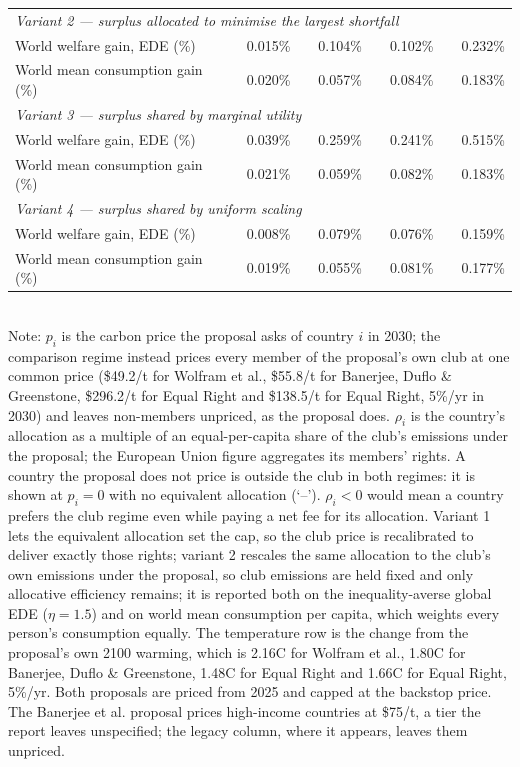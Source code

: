 \begin{table}[htbp]
\begin{tabular}{lcccccccc}
  \midrule
  \multicolumn{9}{l}{\textit{Variant 2 --- surplus allocated to minimise the largest shortfall}} \\
  \quad World welfare gain, EDE (\%) &  & 0.015\% &  & 0.104\% &  & 0.102\% &  & 0.232\% \\
  \quad World mean consumption gain (\%) &  & 0.020\% &  & 0.057\% &  & 0.084\% &  & 0.183\% \\
  \midrule
  \multicolumn{9}{l}{\textit{Variant 3 --- surplus shared by marginal utility}} \\
  \quad World welfare gain, EDE (\%) &  & 0.039\% &  & 0.259\% &  & 0.241\% &  & 0.515\% \\
  \quad World mean consumption gain (\%) &  & 0.021\% &  & 0.059\% &  & 0.082\% &  & 0.183\% \\
  \midrule
  \multicolumn{9}{l}{\textit{Variant 4 --- surplus shared by uniform scaling}} \\
  \quad World welfare gain, EDE (\%) &  & 0.008\% &  & 0.079\% &  & 0.076\% &  & 0.159\% \\
  \quad World mean consumption gain (\%) &  & 0.019\% &  & 0.055\% &  & 0.081\% &  & 0.177\% \\
  \bottomrule
\end{tabular}
\label{tab:equiv_rights_B}
\\[4pt]
{\footnotesize Note: $p_i$ is the carbon price the proposal asks of country $i$ in 2030; the comparison regime instead prices every member of the proposal's own club at one common price (\$49.2/t for Wolfram et al., \$55.8/t for Banerjee, Duflo \& Greenstone, \$296.2/t for Equal Right and \$138.5/t for Equal Right, 5\%/yr in 2030) and leaves non-members unpriced, as the proposal does. $\rho_i$ is the country's allocation as a multiple of an equal-per-capita share of the club's emissions under the proposal; the European Union figure aggregates its members' rights. A country the proposal does not price is outside the club in both regimes: it is shown at $p_i=0$ with no equivalent allocation (`--'). $\rho_i < 0$ would mean a country prefers the club regime even while paying a net fee for its allocation. Variant 1 lets the equivalent allocation set the cap, so the club price is recalibrated to deliver exactly those rights; variant 2 rescales the same allocation to the club's own emissions under the proposal, so club emissions are held fixed and only allocative efficiency remains; it is reported both on the inequality-averse global EDE ($\eta=1.5$) and on world mean consumption per capita, which weights every person's consumption equally. The temperature row is the change from the proposal's own 2100 warming, which is 2.16\textdegree{}C for Wolfram et al., 1.80\textdegree{}C for Banerjee, Duflo \& Greenstone, 1.48\textdegree{}C for Equal Right and 1.66\textdegree{}C for Equal Right, 5\%/yr. Both proposals are priced from 2025 and capped at the backstop price. The Banerjee et al. proposal prices high-income countries at \$75/t, a tier the report leaves unspecified; the legacy column, where it appears, leaves them unpriced.}
\end{table}
